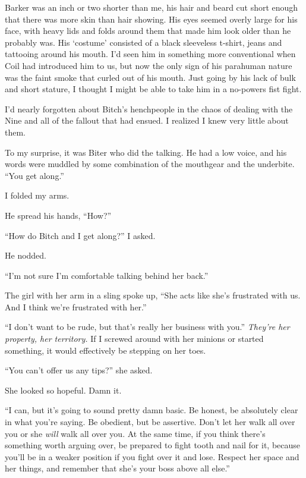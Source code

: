 Barker was an inch or two shorter than me, his hair and beard cut short enough that there was more skin than hair showing.  His eyes seemed overly large for his face, with heavy lids and folds around them that made him look older than he probably was.  His `costume' consisted of a black sleeveless t-shirt, jeans and tattooing around his mouth.  I'd seen him in something more conventional when Coil had introduced him to us, but now the only sign of his parahuman nature was the faint smoke that curled out of his mouth.  Just going by his lack of bulk and short stature, I thought I might be able to take him in a no-powers fist fight.



I'd nearly forgotten about Bitch's henchpeople in the chaos of dealing with the Nine and all of the fallout that had ensued.  I realized I knew very little about them.



To my surprise, it was Biter who did the talking.  He had a low voice, and his words were muddled by some combination of the mouthgear and the underbite.  ``You get along.''



I folded my arms.



He spread his hands, ``How?''



``How do Bitch and I get along?'' I asked.



He nodded.



``I'm not sure I'm comfortable talking behind her back.''



The girl with her arm in a sling spoke up, ``She acts like she's frustrated with us.  And I think we're frustrated with her.''



``I don't want to be rude, but that's really her business with you.''  \emph{They're her property, her territory.  }If I screwed around with her minions or started something, it would effectively be stepping on her toes.



``You can't offer us any tips?'' she asked.



She looked so hopeful.  Damn it.



``I can, but it's going to sound pretty damn basic.  Be honest, be absolutely clear in what you're saying.  Be obedient, but be assertive.  Don't let her walk all over you or she \emph{will} walk all over you.  At the same time, if you think there's something worth arguing over, be prepared to fight tooth and nail for it, because you'll be in a weaker position if you fight over it and lose.  Respect her space and her things, and remember that she's your boss above all else.''



